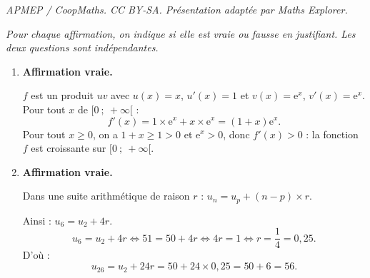 \documentclass[10pt]{article}
\providecommand{\e}{{\mathrm{e}}}
\begin{document}
\noindent\textit{APMEP / CoopMaths. CC BY-SA. Présentation adaptée par Maths Explorer.}\par\medskip
\emph{Pour chaque affirmation, on indique si elle est vraie ou fausse en justifiant. Les deux
questions sont indépendantes.}

\begin{enumerate}
	\item \textbf{Affirmation vraie.}

	$f$ est un produit $uv$ avec $u(x) = x$, $u'(x) = 1$ et $v(x) = \e^x$, $v'(x) = \e^x$.
	Pour tout $x$ de $[0~;~+\infty[$ :
	\[f'(x) = 1 \times \e^x + x \times \e^x = (1+x)\e^x.\]
	Pour tout $x \geqslant 0$, on a $1 + x \geqslant 1 > 0$ et $\e^x > 0$, donc $f'(x) > 0$ :
	la fonction $f$ est croissante sur $[0~;~+\infty[$.

	\item \textbf{Affirmation vraie.}

	Dans une suite arithmétique de raison $r$ : $u_n = u_p + (n-p) \times r$.
	
	Ainsi : $u_6 = u_2 + 4r$.
	\[u_6 = u_2 + 4r \iff 51 = 50 + 4r \iff 4r = 1 \iff r = \dfrac{1}{4} = 0,25.\]
	D'où :
	\[u_{26} = u_2 + 24r = 50 + 24 \times 0,25 = 50 + 6 = 56.\]
\end{enumerate}
\end{document}

